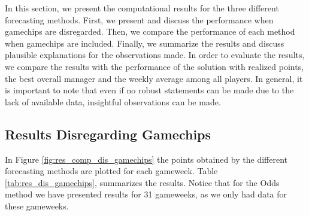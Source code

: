 In this section, we present the computational results for the three different forecasting methods. First, we present and discuss the performance when gamechips are disregarded. Then, we compare the performance of each method when gamechips are included. Finally, we summarize the results and discuss plausible explanations for the observations made. In order to evaluate the results, we compare the results with the performance of the solution with realized points, the best overall manager and the weekly average among all players. In general, it is important to note that even if no robust statements can be made due to the lack of available data, insightful observations can be made.

\newpage

\subsection{Results Disregarding Gamechips}

In Figure \ref{fig:res_comp_dis_gamechips} the points obtained by the different forecasting methods are plotted for each gameweek. Table \ref{tab:res_dis_gamechips}, summarizes the results. Notice that for the Odds method we have presented results for 31 gameweeks, as we only had data for these gameweeks.

